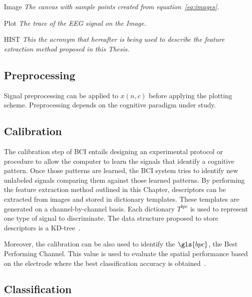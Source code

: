 \begin{story}
\begin{definition}{Image}
\label{def:Image}
\textit{The \textit{canvas} with sample points created from equation~\ref{eq:images}.}
\end{definition}

\begin{definition}{Plot}
\label{def:Plot}
\textit{The trace of the EEG signal on the Image.}
\end{definition}

\begin{definition}{HIST}
\label{def:Plot}
\textit{This the acronym that hereafter is being used to describe the feature extraction method proposed in this Thesis.}
\end{definition}

\end{story}

\subsection{Preprocessing}

Signal preprocessing can be applied to $x(n,c)$ before applying the plotting scheme.  Preprocessing depends on the cognitive paradigm under study.  

\subsection{Calibration}
\label{Calibration}

The calibration step of BCI entails designing an experimental protocol or procedure to allow the computer to learn the signals that identify a cognitive pattern.  Once those patterns are learned, the BCI system tries to identify new unlabeled signals comparing them against those learned patterns.  By performing the feature extraction method outlined in this Chapter, descriptors can be extracted from images and stored in dictionary templates.  These templates are generated on a channel-by-channel basis.  Each dictionary $T^{bpc}$ is used to represent one type of signal to discriminate. The data structure proposed to store descriptors is a KD-tree~\cite{Lowe2004}.

Moreover, the calibration can be also used to identify the $\gls{bpc}$, the Best Performing Channel. This value is used to evaluate the spatial performance based on the electrode where the best classification accuracy is obtained~\cite{Chavarriaga2017}.

\subsection{Classification}
\label{nbnn}

